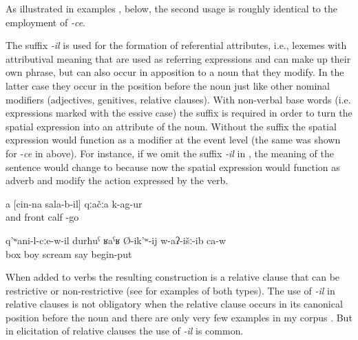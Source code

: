 As illustrated in examples ,  below, the second usage is roughly identical to the employment of \textit{-ce}. 

The suffix \textit{-il} is used for the formation of referential attributes, i.e., lexemes with attributival meaning that are used as referring expressions and can make up their own phrase, but can also occur in apposition to a noun that they modify. In the latter case they occur in the position before the noun just like other nominal modifiers (adjectives, genitives, relative clauses). With non-verbal base words (i.e. expressions marked with the essive case) the suffix is required in order to turn the spatial expression into an attribute of the noun. Without the suffix the spatial expression would function as a modifier at the event level (the same was shown for -\textit{ce} in  above). For instance, if we omit the suffix \textit{-il} in , the meaning of the sentence would change to  because now the spatial expression would function as adverb and modify the action expressed by the verb.

\begin{exe}
	\ex	\label{ex:‎‎‎And the calf before him fell down minor}
	\gll	a	[cin-na	sala-b-il]	qːačːa	k-ag-ur\\
		and		front	calf	-go\\
	\glt	{}
	
	\ex	\label{ex:‎When he suspected, that he had left, the boy in the box started to scream minor}
	\gll	q'ʷani-l-cːe-w-il	durħuˁ	ʁaˁʁ	Ø-ik'ʷ-ij	w-aʔ-išː-ib	ca-w\\
		box	boy	scream	say	begin-put	\\
	\glt	{}
\end{exe}

When added to verbs the resulting construction is a relative clause that can be restrictive or non-restrictive (see  for examples of both types). The use of \textit{-il} in relative clauses is not obligatory  when the relative clause occurs in its canonical position before the noun and there are only very few examples in my corpus . But in elicitation of relative clauses the use of \textit{-il} is common. 

